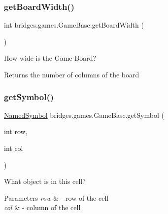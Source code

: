 \subsubsection{\texorpdfstring{get\+Board\+Width()}{getBoardWidth()}}
{\footnotesize\ttfamily int bridges.\+games.\+Game\+Base.\+get\+Board\+Width (\begin{DoxyParamCaption}{ }\end{DoxyParamCaption})\hspace{0.3cm}{\ttfamily [protected]}}



How wide is the Game Board? 

\begin{DoxyReturn}{Returns}
the number of columns of the board 
\end{DoxyReturn}
\mbox{\label{classbridges_1_1games_1_1_game_base_ade3cd7d7c3b317645a41ea93449c0f63}} 
\subsubsection{\texorpdfstring{get\+Symbol()}{getSymbol()}}
{\footnotesize\ttfamily \hyperlink{enumbridges_1_1base_1_1_named_symbol}{Named\+Symbol} bridges.\+games.\+Game\+Base.\+get\+Symbol (\begin{DoxyParamCaption}\item[{int}]{row,  }\item[{int}]{col }\end{DoxyParamCaption})\hspace{0.3cm}{\ttfamily [protected]}}



What object is in this cell? 


\begin{DoxyParams}{Parameters}
{\em row} & -\/ row of the cell \\
\hline
{\em col} & -\/ column of the cell \\
\hline
\end{DoxyParams}
\mbox{\label{classbridges_1_1games_1_1_game_base_a8a7782a6d1238ea3cbe26da9c04b2416}} 
